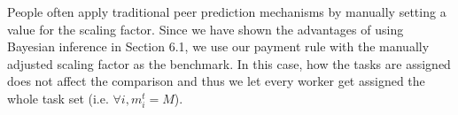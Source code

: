People often apply traditional peer prediction mechanisms by manually setting a value for the scaling factor.
Since we have shown the advantages of using Bayesian inference in Section 6.1, we use our payment rule with the manually adjusted scaling factor as the benchmark. 
In this case, how the tasks are assigned does not affect the comparison and thus we let every worker get assigned the whole task set (i.e. $\forall i, m_i^t = M$). 

%
%
 

